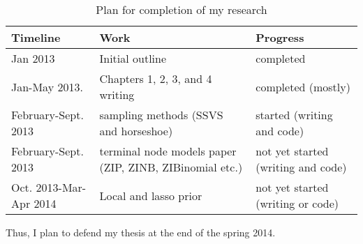 \documentclass[12pt]{article}
\def\newabbrev#1{\label{#1}}
\begin{document}
\begin{table}[H]
\begin{small}
\hspace{-0.5in}
\begin{tabular}{lll}
Timeline & Work & Progress\\
\hline
 Jan 2013   & Initial outline & completed\\
Jan-May 2013.  & Chapters 1, 2, 3, and 4 writing & completed (mostly) \\
February-Sept. 2013  & sampling methods (SSVS and horseshoe) & started (writing and code)\\
February-Sept. 2013  & terminal node models paper (ZIP, ZINB,\newabbrev{abbrev:ZINB} ZIBinomial etc.) & not yet started (writing and code)\\
Oct. 2013-Mar-Apr 2014 &  Local and lasso prior  & not yet started (writing or code)\\
\end{tabular}
\end{small}
\caption{Plan for completion of my research}
\label{tab:plan}
\end{table}

Thus, I plan to defend my thesis at the end of the spring 2014. 

%

\pagebreak



\pagebreak

%




\end{document}
